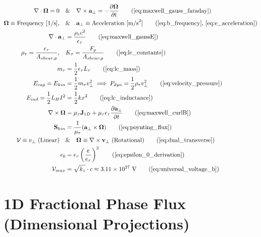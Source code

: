\begin{tcolorbox}[recallbox, title={\ref{box:em_lc_isomorphism}. Continuum Kinematics \& The LC-Acoustic Isomorphism}]
\begin{align}
    \nabla \cdot \boldsymbol{\Omega} = 0 \quad &\text{\&} \quad \nabla \times \mathbf{a}_\perp = -\frac{\partial \boldsymbol{\Omega}}{\partial t} \tag{\ref{eq:maxwell_gauss_faraday}} \\
    \boldsymbol{\Omega} \equiv \text{Frequency } [1/\text{s}], \quad &\text{\&} \quad \mathbf{a}_\perp \equiv \text{Acceleration } [\text{m/s}^2] \tag{\ref{eq:b_frequency}, \ref{eq:e_acceleration}} \\
    \nabla \cdot \mathbf{a}_\perp &= \frac{\rho_e c^2}{\epsilon_{\tau}} \tag{\ref{eq:maxwell_gaussE}} \\
    \rho_{\tau} = \frac{\epsilon_{\tau}}{A_{shear, p}}, \quad &K_\tau = \frac{F_p}{A_{shear, p}} \tag{\ref{eq:lc_constants}} \\
    m_\tau &= \frac{1}{2} \epsilon_{\tau} L_\tau \tag{\ref{eq:lc_mass}} \\
    E_{cap} = E_{kin} &= \frac{1}{2} m_{\tau} v_{\perp}^2 \implies P_{dyn} = \frac{1}{2}\rho_{\tau} v_{\perp}^2 \tag{\ref{eq:velocity_pressure}} \\
    E_{ind} = \frac{1}{2} L_H I^2 &= \frac{1}{2} k x^2 \tag{\ref{eq:lc_inductance}} \\
    \nabla \times \boldsymbol{\Omega} &= \mu_{\tau} \mathbf{J}_{1D} + \mu_{\tau} \epsilon_{\tau} \frac{\partial \mathbf{a}_\perp}{\partial t} \tag{\ref{eq:maxwell_curlB}} \\
    \mathbf{S}_{kin} &= \frac{1}{\mu_{\tau}} (\mathbf{a}_\perp \times \boldsymbol{\Omega}) \tag{\ref{eq:poynting_flux}} \\
    \mathcal{V} \equiv v_{\perp} \text{ (Linear)} \quad &\text{\&} \quad \boldsymbol{\Omega} \equiv \nabla \times \mathbf{v}_{\perp} \text{ (Rotational)} \tag{\ref{eq:dual_transverse}} \\
    \epsilon_0 &= \epsilon_{\tau} \left( \frac{e}{e_{\tau}} \right)^2 \tag{\ref{eq:epsilon_0_derivation}} \\
    \mathcal{V}_{max} &= \sqrt{k_z} \cdot c \approx 3.11 \times 10^{27} \text{ V} \tag{\ref{eq:universal_voltage_b}}
\end{align}
\end{tcolorbox}

\section{1D Fractional Phase Flux (Dimensional Projections)}
\label{sec:deriv_tensor_projections}

